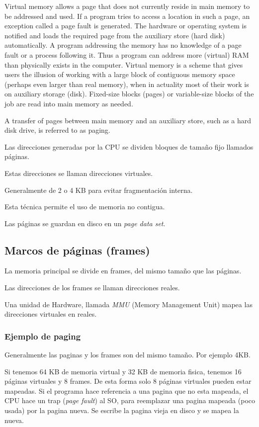 \documentclass[a4paper, twoside]{article}
\begin{document}
Virtual memory allows a page that does not currently reside in main memory to be addressed and used. If a program tries to access a location in such a page, an exception called a page fault is generated. The hardware or operating system is notified and loads the required page from the auxiliary store (hard disk) automatically. A program addressing the memory has no knowledge of a page fault or a process following it. Thus a program can address more (virtual) RAM than physically exists in the computer. Virtual memory is a scheme that gives users the illusion of working with a large block of contiguous memory space (perhaps even larger than real memory), when in actuality most of their work is on auxiliary storage (disk). Fixed-size blocks (pages) or variable-size blocks of the job are read into main memory as needed.

A transfer of pages between main memory and an auxiliary store, such as a hard disk drive, is referred to as paging.

Las direcciones generadas por la CPU se dividen bloques de tamaño fijo llamados páginas.

Estas direcciones se llaman direcciones virtuales.

Generalmente de 2 o 4 KB para evitar fragmentación interna.

Esta técnica permite el uso de memoria no contigua.

Las páginas se guardan en disco en un \emph{page data set}.

\subsection{Marcos de páginas (frames)}
La memoria principal se divide en frames, del mismo tamaño que las páginas.

Las direcciones de los frames se llaman direcciones reales.

Una unidad de Hardware, llamada \emph{MMU} (Memory Management Unit) mapea las direcciones virtuales en reales.

\subsubsection{Ejemplo de paging}
Generalmente las paginas y los frames son del mismo tamaño. Por ejemplo 4KB.

Si tenemos 64 KB de memoria virtual y 32 KB de memoria fisica, tenemos 16 páginas virtuales y 8 frames. De esta forma solo 8 páginas virtuales pueden estar mapeadas. Si el programa hace referencia a una pagina que no esta mapeada, el CPU hace un trap (\emph{page fault}) al SO, para reemplazar una pagina mapeada (poco usada) por la pagina nueva. Se escribe la pagina vieja en disco y se mapea la nueva.
\end{document}
